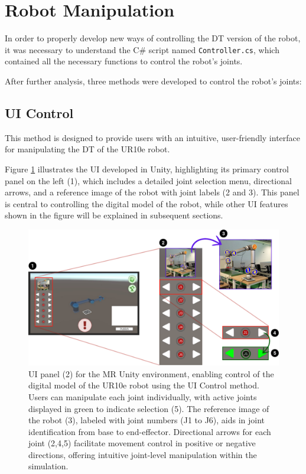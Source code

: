 \section{Robot Manipulation}
In order to properly develop new ways of controlling the \ac{DT} version of the robot, it was necessary to understand the C\# script named \texttt{Controller.cs}, which contained all the necessary functions to control the robot's joints.


After further analysis, three methods were developed to control the robot's joints:

\subsection{UI Control}
\label{subsection:ui-control-method}
This method is designed to provide users with an intuitive, user-friendly interface for manipulating the \ac{DT} of the UR10e robot. 

Figure \ref{f:ui-control} illustrates the \ac{UI} developed in Unity, highlighting its primary control panel on the left (1), which includes a detailed joint selection menu, directional arrows, and a reference image of the robot with joint labels (2 and 3). This panel is central to controlling the digital model of the robot, while other \ac{UI} features shown in the figure will be explained in subsequent sections.

\begin{figure}[h]
    \centering
    \includegraphics[width=\textwidth]{figs/interface-numerada-2.png}
    \caption{\ac{UI} panel (2) for the \ac{MR} Unity environment, enabling control of the digital model of the UR10e robot using the \ac{UI} Control method. Users can manipulate each joint individually, with active joints displayed in green to indicate selection (5). The reference image of the robot (3), labeled with joint numbers (J1 to J6), aids in joint identification from base to end-effector. Directional arrows for each joint (2,4,5) facilitate movement control in positive or negative directions, offering intuitive joint-level manipulation within the simulation.}
    \label{f:ui-control}
\end{figure}


